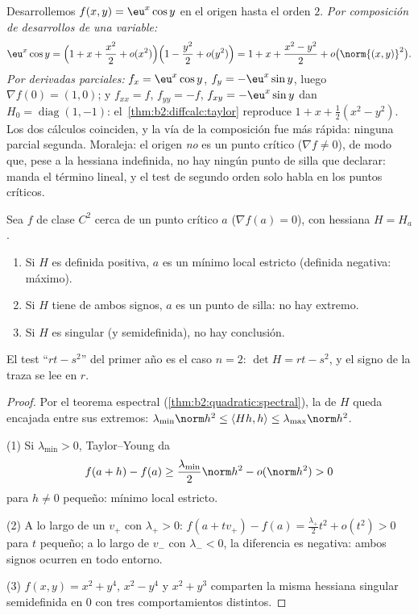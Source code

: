 \begin{example}\label{ex:b2:diffcalc:taylortwoways}
Desarrollemos $f(x, y) = \eu^x\cos y$ en el origen hasta el orden
$2$. \emph{Por composición de desarrollos de una variable:}
\[
\eu^x\cos y = \Bigl(1 + x + \frac{x^2}{2} +
o(x^2)\Bigr)\Bigl(1 - \frac{y^2}{2} + o(y^2)\Bigr)
= 1 + x + \frac{x^2 - y^2}{2} + o\bigl(\norm{(x,y)}^2\bigr) .
\]
\emph{Por derivadas parciales:} $f_x = \eu^x\cos y$, $f_y =
-\eu^x\sin y$, luego $\nabla f(0) = (1, 0)$; y $f_{xx} = f$, $f_{yy}
= -f$, $f_{xy} = -\eu^x\sin y$ dan $H_0 = \operatorname{diag}(1,
-1)$: el~\cref{thm:b2:diffcalc:taylor} reproduce $1 + x + \frac12(x^2
- y^2)$. Los dos cálculos coinciden, y la vía de la composición fue
más rápida: ninguna parcial segunda. Moraleja: el origen \emph{no} es
un punto crítico ($\nabla f \neq 0$), de modo que, pese a la hessiana
indefinida, no hay ningún punto de silla que declarar: manda el
término lineal, y el test de segundo orden solo habla en los puntos
críticos.
\end{example}

\begin{theorem}\label{thm:b2:diffcalc:extrema}
Sea $f$ de clase $C^2$ cerca de un punto crítico $a$ ($\nabla f(a) =
0$), con hessiana $H = H_a$.
\begin{enumerate}
  \item Si $H$ es definida positiva, $a$ es un mínimo local estricto
        (definida negativa: máximo).
  \item Si $H$ tiene  de ambos signos, $a$ es un punto
        de silla: no hay extremo.
  \item Si $H$ es singular (y semidefinida), no hay conclusión.
\end{enumerate}
El test ``$rt - s^2$'' del primer año es el caso $n = 2$: $\det H =
rt - s^2$, y el signo de la traza se lee en $r$.
\end{theorem}

\begin{proof}
Por el teorema espectral (\cref{thm:b2:quadratic:spectral}), la
 de $H$ queda encajada entre sus 
extremos: $\lambda_{\min}\norm h^2 \leq \langle Hh, h\rangle \leq
\lambda_{\max}\norm h^2$.

(1) Si $\lambda_{\min} > 0$, Taylor--Young da
\[
f(a + h) - f(a) \geq \frac{\lambda_{\min}}{2}\norm h^2 -
o(\norm h^2) > 0
\]
para $h \neq 0$ pequeño: mínimo local estricto.

(2) A lo largo de un  $v_+$ con $\lambda_+ > 0$: $f(a +
tv_+) - f(a) = \frac{\lambda_+}{2}t^2 + o(t^2) > 0$ para $t$ pequeño;
a lo largo de $v_-$ con $\lambda_- < 0$, la diferencia es negativa:
ambos signos ocurren en todo entorno.

(3) $f(x,y) = x^2 + y^4$, $x^2 - y^4$ y $x^2 + y^3$ comparten la
misma hessiana singular semidefinida en $0$ con tres comportamientos
distintos.
\end{proof}


